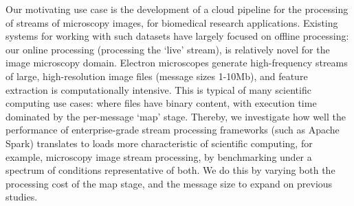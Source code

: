 \documentclass[conference]{IEEEtran}
\begin{document}
Our motivating use case 
is the development of a cloud pipeline for the processing of streams of microscopy images, for biomedical research applications. Existing systems for working with such datasets have largely focused on offline processing: our online processing (processing the `live' stream), 
is relatively novel for the image microscopy domain. %
Electron microscopes generate high-frequency streams of large, high-resolution image files (message sizes 1-10Mb), and feature extraction is computationally intensive. This is typical of many scientific computing use cases: where files have binary content, 
with execution time dominated by the per-message `map' stage.
Thereby, we investigate how well the performance of enterprise-grade stream processing frameworks (such as Apache Spark) translates to loads more characteristic of scientific computing, for example, microscopy image stream processing, by benchmarking under a spectrum of conditions representative of both. We do this by varying both the processing cost of the map stage, and the message size to expand on previous studies.

\end{document}
